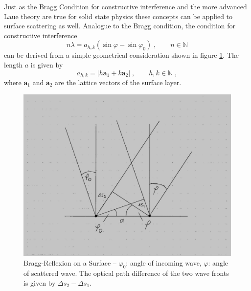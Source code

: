\documentclass[a4paper]{scrartcl}
\numberwithin{equation}{section}
\numberwithin{figure}{section}
\numberwithin{table}{section}
\newcommand{\eq}[2]{\begin{equation}#1\label{#2}\end{equation}}
\newcommand{\ve}[1]{\mathbf{ #1} }
\begin{document}
Just as the Bragg Condition for constructive interference and the more advanced Laue theory are true for solid state physics these concepts can be applied to surface scattering as well. Analogue to the Bragg condition, the condition for constructive interference 
\eq{n \lambda = a_{h,k} (\sin \varphi - \sin \varphi_0 ) \;, \qquad n \in \mathbb N }{bragg}
can be derived from a simple geometrical consideration shown in figure \ref{fig:bragg}. The length $a$ is given by
\eq{a_{h,k} = |h \ve a_1 + k \ve a_2|\;, \qquad h,k \in \mathbb N \; , }{}
where $\ve a_1$ and $\ve a_2$ are the lattice vectors of the surface layer.
\begin{figure}
  \centering
   	\includegraphics[width=0.5\linewidth]{pic/bragg.jpg}

 \caption{ Bragg-Reflexion on a Surface -- $\varphi_0$: angle of incoming wave, $\varphi$: angle of scattered wave. The optical path difference of the two wave fronts is given by $\Delta s_2 - \Delta s_1$.}
        \label{fig:bragg}
\end{figure}
\FloatBarrier
\end{document}
